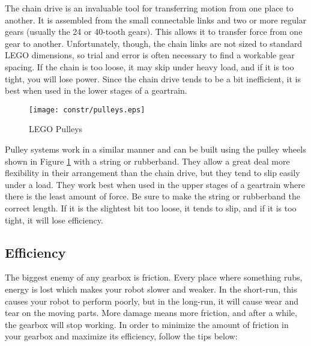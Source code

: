 The chain drive is an invaluable tool for transferring motion from one place to another. It is assembled from the small connectable links and two or more regular gears (usually the 24 or 40-tooth gears). This allows it to transfer force from one gear to another.  Unfortunately, though, the chain links are not sized to standard LEGO dimensions, so trial and error is often necessary to find a workable gear spacing.  If the chain is too loose, it may skip under heavy load, and if it is too tight, you will lose power.  Since the chain drive tends to be a bit inefficient, it is best when used in the lower stages of a geartrain.

\begin{figure}[htbp]
\begin{center}
\texttt{[image: constr/pulleys.eps]}
\caption{LEGO Pulleys}
\label{pulleys}
\end{center}
\end{figure}

Pulley systems work in a similar manner and can be built using the pulley wheels shown in Figure \ref{pulleys} with a string or rubberband.  They allow a great deal more flexibility in their arrangement than the chain drive, but they tend to slip easily under a load.  They work best when used in the upper stages of a geartrain where there is the least amount of force.  Be sure to make the string or rubberband the correct length.  If it is the slightest bit too loose, it tends to slip, and if it is too tight, it will lose efficiency.

\subsection{Efficiency}

The biggest enemy of any gearbox is friction. Every place where
something rubs, energy is lost which makes your robot slower and weaker.
In the short-run, this causes your robot to perform poorly, but in the
long-run, it will cause wear and tear on the moving parts. More damage
means more friction, and after a while, the gearbox will stop working.
In order to minimize the amount of friction in your gearbox and maximize
its efficiency, follow the tips below:

